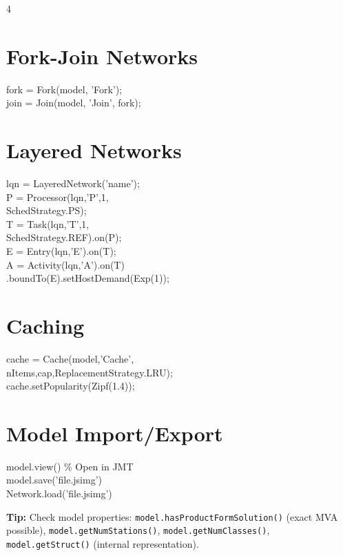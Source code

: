 \documentclass[9pt,landscape,a4paper]{extarticle}
\begin{document}
\begin{multicols}{4}
\section*{Fork-Join Networks}
\begin{codebox}
fork = Fork(model, 'Fork');\\
join = Join(model, 'Join', fork);
\end{codebox}

\section*{Layered Networks}
\begin{codebox}
lqn = LayeredNetwork('name');\\
P = Processor(lqn,'P',1,\\
\quad SchedStrategy.PS);\\
T = Task(lqn,'T',1,\\
\quad SchedStrategy.REF).on(P);\\
E = Entry(lqn,'E').on(T);\\
A = Activity(lqn,'A').on(T)\\
\quad .boundTo(E).setHostDemand(Exp(1));
\end{codebox}

\section*{Caching}
\begin{codebox}
cache = Cache(model,'Cache',\\
\quad nItems,cap,ReplacementStrategy.LRU);\\
cache.setPopularity(Zipf(1.4));
\end{codebox}

\section*{Model Import/Export}
\begin{codebox}
model.view()  \% Open in JMT\\
model.save('file.jsimg')\\
Network.load('file.jsimg')
\end{codebox}

\begin{tipbox}
\textbf{Tip:} Check model properties: \texttt{model.hasProductFormSolution()} (exact MVA possible), \texttt{model.getNumStations()}, \texttt{model.getNumClasses()}, \texttt{model.getStruct()} (internal representation).
\end{tipbox}


\end{multicols}
\end{document}
